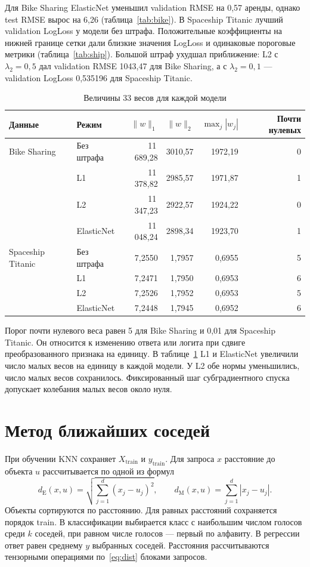 \documentclass[a4paper,12pt]{article}
\begin{document}
Для Bike Sharing ElasticNet уменьшил validation RMSE на 0,57 аренды, однако test RMSE вырос на 6,26 (таблица~\ref{tab:bike}). В Spaceship Titanic лучший validation LogLoss у модели без штрафа. Положительные коэффициенты на нижней границе сетки дали близкие значения LogLoss и одинаковые пороговые метрики (таблица~\ref{tab:ship}). Большой штраф ухудшал приближение: L2 с $\lambda_2=0{,}5$ дал validation RMSE 1043,47 для Bike Sharing, а с $\lambda_2=0{,}1$ — validation LogLoss 0,535196 для Spaceship Titanic.

\begin{table}[H]
\centering
\caption{Величины 33 весов для каждой модели}
\label{tab:weights}
\small
\begin{tabular}{llrrrr}
\toprule
Данные & Режим & $\lVert w\rVert_1$ & $\lVert w\rVert_2$ & $\max_j|w_j|$ & Почти нулевых \\
\midrule
Bike Sharing & Без штрафа & 11\,689,28 & 3010,57 & 1972,19 & 0 \\
& L1 & 11\,378,82 & 2985,57 & 1971,87 & 1 \\
& L2 & 11\,347,23 & 2922,57 & 1924,22 & 0 \\
& ElasticNet & 11\,048,24 & 2898,34 & 1923,70 & 1 \\
\addlinespace
Spaceship Titanic & Без штрафа & 7,2550 & 1,7957 & 0,6955 & 5 \\
& L1 & 7,2471 & 1,7950 & 0,6953 & 6 \\
& L2 & 7,2526 & 1,7952 & 0,6953 & 5 \\
& ElasticNet & 7,2448 & 1,7945 & 0,6952 & 6 \\
\bottomrule
\end{tabular}
\end{table}

Порог почти нулевого веса равен 5 для Bike Sharing и 0,01 для Spaceship Titanic. Он относится к изменению ответа или логита при сдвиге преобразованного признака на единицу. В таблице~\ref{tab:weights} L1 и ElasticNet увеличили число малых весов на единицу в каждой модели. У L2 обе нормы уменьшились, число малых весов сохранилось. Фиксированный шаг субградиентного спуска допускает колебания малых весов около нуля.

\section{Метод ближайших соседей}

При обучении KNN сохраняет $X_{\text{train}}$ и $y_{\text{train}}$. Для запроса $x$ расстояние до объекта $u$ рассчитывается по одной из формул
\begin{equation}
d_{\mathrm{E}}(x,u)=\sqrt{\sum_{j=1}^{d}(x_j-u_j)^2},
\qquad
d_{\mathrm{M}}(x,u)=\sum_{j=1}^{d}|x_j-u_j|.
\label{eq:dist}
\end{equation}
Объекты сортируются по расстоянию. Для равных расстояний сохраняется порядок train. В классификации выбирается класс с наибольшим числом голосов среди $k$ соседей, при равном числе голосов — первый по алфавиту. В регрессии ответ равен среднему $y$ выбранных соседей. Расстояния рассчитываются тензорными операциями по~\eqref{eq:dist} блоками запросов.
\end{document}
